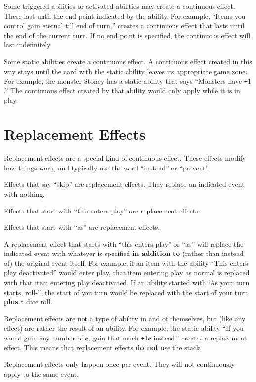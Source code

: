 \documentclass[
  fontsize=10pt,
  paper=a5,
  version=last,
  chapterprefix=true,
  bindingoffset=5mm,
  ]{scrbook}
\newcommand*{\inlineicon}[1]{%
    \raisebox{-.3\baselineskip}{%
        \smash{%
            \texttt{[image: \#1]}%
        }%
    }%
}
\newcommand{\dice}{\inlineicon{./assets/ms-dice.png}}
\def\plus{\texttt{+}}
\begin{document}
    Some triggered abilities or activated abilities may create a continuous effect. These last until the end point indicated by the ability. For example, “Items you control gain eternal till end of turn,” creates a continuous effect that lasts until the end of the current turn. If no end point is specified, the continuous effect will last indefinitely.

    Some static abilities create a continuous effect. A continuous effect created in this way stays until the card with the static ability leaves its appropriate game zone. For example, the monster Stoney has a static ability that says “Monsters have \plus1 \dice.” The continuous effect created by that ability would only apply while it is in play.

    \section{Replacement Effects}
    Replacement effects are a special kind of continuous effect. These effects modify how things work, and typically use the word “instead” or “prevent”.

    Effects that say “skip” are replacement effects. They replace an indicated event with nothing.

    Effects that start with “this enters play” are replacement effects.

    Effects that start with “as” are replacement effects.

    A replacement effect that starts with “this enters play” or “as” will replace the indicated event with whatever is specified \textbf{in addition to} (rather than instead of) the original event itself. For example, if an item with the ability “This enters play deactivated” would enter play, that item entering play as normal is replaced with that item entering play deactivated. If an ability started with ‘As your turn starts, roll-”, the start of you turn would be replaced with the start of your turn \textbf{plus} a dice roll.

    Replacement effects are not a type of ability in and of themselves, but (like any effect) are rather the result of an ability. For example, the static ability “If you would gain any number of ¢, gain that much \plus1¢ instead.” creates a replacement effect. This means that replacement effects \textbf{do not} use the stack.

    Replacement effects only happen once per event. They will not continuously apply to the same event.
\end{document}
